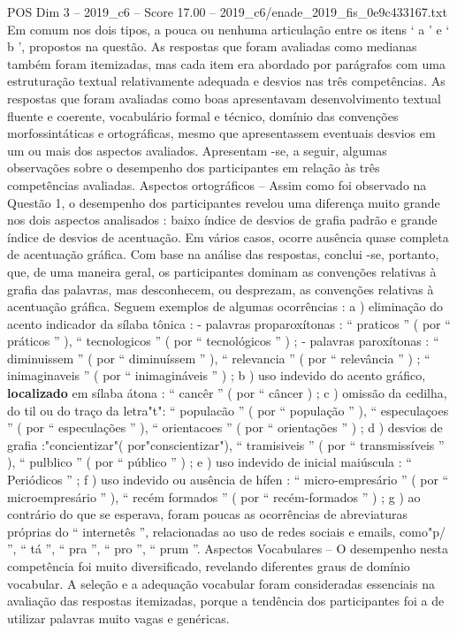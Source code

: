 \begin{textsample}{POS Dim 3 – 2019\_c6 – Score 17.00 – 2019\_c6/enade\_2019\_fis\_0e9c433167.txt}
Em comum nos dois tipos, a pouca ou nenhuma articulação entre os itens ‘ a ’ e ‘ b ’, propostos na questão.
As respostas que foram avaliadas como medianas também foram itemizadas, mas cada item era abordado por parágrafos com uma estruturação textual relativamente adequada e desvios nas três competências.
As respostas que foram avaliadas como boas apresentavam desenvolvimento textual fluente e coerente, vocabulário formal e técnico, domínio das convenções morfossintáticas e ortográficas, mesmo que apresentassem eventuais desvios em um ou mais dos aspectos avaliados.
Apresentam -se, a seguir, algumas observações sobre o desempenho dos participantes em relação às três competências avaliadas.
Aspectos ortográficos – Assim como foi observado na Questão 1, o desempenho dos participantes revelou uma diferença muito grande nos dois aspectos analisados : baixo índice de desvios de grafia padrão e grande índice de desvios de acentuação.
Em vários casos, ocorre ausência quase completa de acentuação gráfica.
Com base na análise das respostas, conclui -se, portanto, que, de uma maneira geral, os participantes dominam as convenções relativas à grafia das palavras, mas desconhecem, ou desprezam, as convenções relativas à acentuação gráfica.
Seguem exemplos de algumas ocorrências : a ) eliminação do acento indicador da sílaba tônica : - palavras proparoxítonas : “ praticos ” ( por “ práticos ” ), “ tecnologicos ” ( por “ tecnológicos ” ) ; - palavras paroxítonas : “ diminuissem ” ( por “ diminuíssem ” ), “ relevancia ” ( por “ relevância ” ) ; “ inimaginaveis ” ( por “ inimagináveis ” ) ; b ) uso indevido do acento gráfico, \textbf{localizado} em sílaba átona : “ cancêr ” ( por “ câncer ) ; c ) omissão da cedilha, do til ou do traço da letra"t": “ populacão ” ( por “ população ” ), “ especulaçoes ” ( por “ especulações ” ), “ orientacoes ” ( por “ orientações ” ) ; d ) desvios de grafia :"concientizar"( por"conscientizar"), “ tramisiveis ” ( por “ transmissíveis ” ), “ pulblico ” ( por “ público ” ) ; e ) uso indevido de inicial maiúscula : “ Periódicos ” ; f ) uso indevido ou ausência de hífen : “ micro-empresário ” ( por “ microempresário ” ), “ recém formados ” ( por “ recém-formados ” ) ; g ) ao contrário do que se esperava, foram poucas as ocorrências de abreviaturas próprias do “ internetês ”, relacionadas ao uso de redes sociais e emails, como"p/ ”, “ tá ”, “ pra ”, “ pro ”, “ prum ”.
Aspectos Vocabulares – O desempenho nesta competência foi muito diversificado, revelando diferentes graus de domínio vocabular.
A seleção e a adequação vocabular foram consideradas essenciais na avaliação das respostas itemizadas, porque a tendência dos participantes foi a de utilizar palavras muito vagas e genéricas.

\end{textsample}
